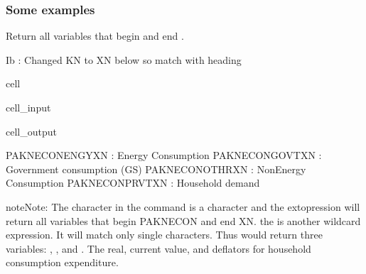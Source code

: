 \documentclass[letterpaper,10pt,english]{jupyterBook}
\begin{document}
\subsubsection{Some examples}
\label{\detokenize{content/06_WBModels/LoadingWBModel:some-examples}}
\sphinxAtStartPar
Return all variables that begin  and end .

\sphinxAtStartPar
Ib : Changed KN to XN below so match with heading 

\begin{sphinxuseclass}{cell}\begin{sphinxVerbatimInput}

\begin{sphinxuseclass}{cell_input}
\begin{sphinxVerbatim}[commandchars=\\\{\}]
\PYG{p}{[}\PYG{p}{]}
\end{sphinxVerbatim}

\end{sphinxuseclass}\end{sphinxVerbatimInput}
\begin{sphinxVerbatimOutput}

\begin{sphinxuseclass}{cell_output}
\begin{sphinxVerbatim}[commandchars=\\\{\}]
PAKNECONENGYXN : Energy Consumption
PAKNECONGOVTXN : Government consumption (G\PYGZam{}S)
PAKNECONOTHRXN : Non\PYGZhy{}Energy Consumption
PAKNECONPRVTXN : Household demand
\end{sphinxVerbatim}

\end{sphinxuseclass}\end{sphinxVerbatimOutput}

\end{sphinxuseclass}
\begin{sphinxadmonition}{note}{Note:}
\sphinxAtStartPar
{}
The \sphinxcode{\sphinxupquote{*}} character in the command  is a  character and the extopression will return all variables that begin PAKNECON and end XN.  the  is another wildcard expression. It will match only single characters.  Thus   would return three variables: , , and .  The real, current value, and deflators for household consumption expenditure.
\end{sphinxadmonition}
\end{document}
